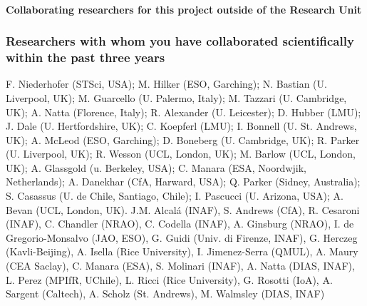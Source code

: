 \documentclass[10pt,fleqn,twoside]{article}
\begin{document}


\paragraph{Collaborating researchers for this project outside of
  the Research Unit}


\subsubsection{Researchers with whom you have collaborated scientifically within the past three years}

F. Niederhofer (STSci, USA); M. Hilker (ESO, Garching); N. Bastian (U. Liverpool,
UK); M. Guarcello (U. Palermo, Italy); M. Tazzari (U. Cambridge, UK);
A. Natta (Florence, Italy); R. Alexander (U. Leicester); D. Hubber
(LMU); J. Dale (U. Hertfordshire, UK); C. Koepferl (LMU); I. Bonnell
(U. St. Andrews, UK); A. McLeod (ESO, Garching); D. Boneberg
(U. Cambridge, UK); R. Parker (U. Liverpool, UK); R. Wesson (UCL,
London, UK); M. Barlow (UCL, London, UK); A. Glassgold (u. Berkeley,
USA); C. Manara (ESA, Noordwjik, Netherlands); A. Danekhar (CfA,
Harward, USA); Q. Parker (Sidney, Australia); S. Casassus
(U. de Chile, Santiago, Chile); I. Pascucci (U. Arizona, USA);
A. Bevan (UCL, London, UK).
J.M. Alcal\'a (INAF), S. Andrews (CfA), R. Cesaroni (INAF),
C. Chandler (NRAO), C. Codella (INAF), A. Ginsburg (NRAO), I. de
Gregorio-Monsalvo (JAO, ESO), G. Guidi (Univ. di Firenze, INAF),
G. Herczeg (Kavli-Beijing), A. Isella (Rice University),
I. Jimenez-Serra (QMUL), A. Maury (CEA Saclay), C. Manara (ESA),
S. Molinari (INAF), A. Natta (DIAS, INAF), L. Perez (MPIfR, UChile),
L. Ricci (Rice University), G. Rosotti (IoA), A. Sargent (Caltech),
A. Scholz (St. Andrews), M. Walmsley (DIAS, INAF)
\end{document}
